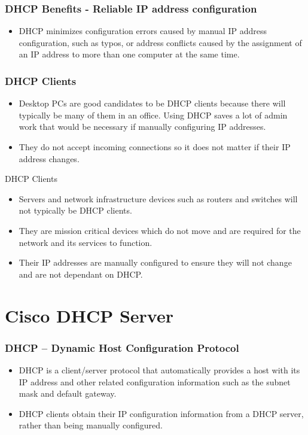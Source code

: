 \documentclass[pdflatex,compress,mathserif]{beamer}
\begin{document}
\begin{frame}
	\frametitle{DHCP Benefits - Reliable IP address configuration}
	\begin{itemize}
		\item DHCP minimizes configuration errors caused by manual IP address
configuration, such as typos, or address conflicts caused by the
assignment of an IP address to more than one computer at the same
time.
	\end{itemize}
\end{frame}

\begin{frame}
	\frametitle{DHCP Clients}
	\begin{itemize}
		\item Desktop PCs are good candidates to be DHCP clients because there will
typically be many of them in an office. Using DHCP saves a lot of admin
work that would be necessary if manually configuring IP addresses.
		\item They do not accept incoming connections so it does not matter if their
IP address changes.
	\end{itemize}
\end{frame}

\begin{frame}{DHCP Clients}
	\begin{itemize}
		\item Servers and network infrastructure devices such as routers and
switches will not typically be DHCP clients.
		\item They are mission critical devices which do not move and are required
for the network and its services to function.
		\item Their IP addresses are manually configured to ensure they will not
change and are not dependant on DHCP.
	\end{itemize}
\end{frame}

\section{Cisco DHCP Server}

\begin{frame}
	\frametitle{DHCP – Dynamic Host Configuration Protocol}
	\begin{itemize}
		\item DHCP is a client/server protocol that automatically provides a host
with its IP address and other related configuration information such as
the subnet mask and default gateway.
		\item DHCP clients obtain their IP configuration information from a DHCP
server, rather than being manually configured.
	\end{itemize}
\end{frame}
\end{document}
